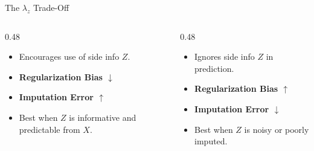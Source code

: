 \documentclass[aspectratio=169,xcolor={dvipsnames,table}]{beamer}
\newcommand{\lamz}{\lambda_z}
\begin{document}
\begin{frame}{The $\lamz$ Trade-Off}
    \begin{columns}[T]
        \begin{column}{0.48\textwidth}
            \begin{tcolorbox}[colback=AccentGreen!5,colframe=AccentGreen,title=\textbf{Small $\lamz$ (Full Trust)}]
                \begin{itemize}
                    \item Encourages use of side info $Z$.
                    \item \textbf{Regularization Bias $\downarrow$}
                    \item \textbf{Imputation Error $\uparrow$}
                    \item Best when $Z$ is informative and predictable from $X$.
                \end{itemize}
            \end{tcolorbox}
        \end{column}
        \begin{column}{0.48\textwidth}
            \begin{tcolorbox}[colback=AccentPink!5,colframe=AccentPink,title=\textbf{Large $\lamz$ (No Trust)}]
                \begin{itemize}
                    \item Ignores side info $Z$ in prediction.
                    \item \textbf{Regularization Bias $\uparrow$}
                    \item \textbf{Imputation Error $\downarrow$}
                    \item Best when $Z$ is noisy or poorly imputed.
                \end{itemize}
            \end{tcolorbox}
        \end{column}
    \end{columns}
\end{frame}
\end{document}
